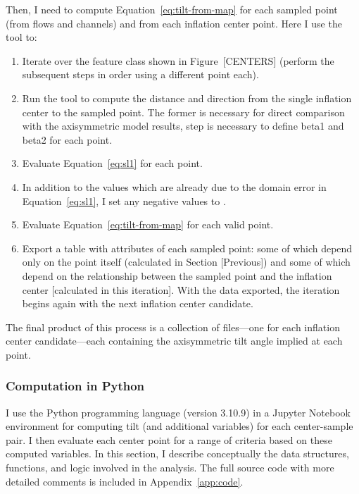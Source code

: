 Then, I need to compute Equation~\eqref{eq:tilt-from-map} for each sampled point (from flows and channels) and from each inflation center point. Here I use the  tool to:
\begin{enumerate}
    \item Iterate over the feature class shown in Figure~[CENTERS] (perform the subsequent steps in order using a different point each).
    \item Run the  tool to compute the distance and direction from the single inflation center to the sampled point. The former is necessary for direct comparison with the axisymmetric model results, step is necessary to define \acs{beta1} and \acs{beta2} for each point.
    \item Evaluate Equation~\eqref{eq:sl1} for each point.
    \item In addition to the values which are already  due to the domain error in Equation~\eqref{eq:sl1}, I set any negative values to .
    \item Evaluate Equation~\eqref{eq:tilt-from-map} for each valid point.
    \item Export a table with attributes of each sampled point: some of which depend only on the point itself (calculated in Section [Previous]) and some of which depend on the relationship between the sampled point and the inflation center [calculated in this iteration]. With the data exported, the iteration begins again with the next inflation center candidate.
\end{enumerate}
The final product of this process is a collection of  files---one for each inflation center candidate---each containing the axisymmetric tilt angle implied at each point. 

\subsubsection{Computation in Python}\label{sec:map-python}

I use the Python programming language (version 3.10.9) in a Jupyter Notebook environment for computing tilt (and additional variables) for each center-sample pair. I then evaluate each center point for a range of criteria based on these computed variables. In this section, I describe conceptually the data structures, functions, and logic involved in the analysis. The full source code with more detailed comments is included in Appendix~\ref{app:code}.

